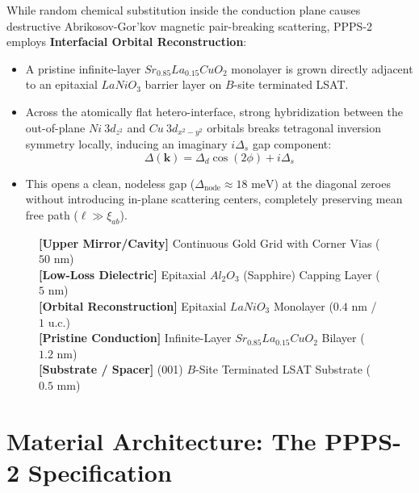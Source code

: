\documentclass[10pt,twocolumn,letterpaper]{article}
\begin{document}
While random chemical substitution inside the conduction plane causes destructive Abrikosov-Gor'kov magnetic pair-breaking scattering, PPPS-2 employs \textbf{Interfacial Orbital Reconstruction}:
\begin{itemize}
    \item A pristine infinite-layer $Sr_{0.85}La_{0.15}CuO_2$ monolayer is grown directly adjacent to an epitaxial $LaNiO_3$ barrier layer on $B$-site terminated LSAT.
    \item Across the atomically flat hetero-interface, strong hybridization between the out-of-plane $Ni\ 3d_{z^2}$ and $Cu\ 3d_{x^2-y^2}$ orbitals breaks tetragonal inversion symmetry locally, inducing an imaginary $i\Delta_s$ gap component:
    \begin{equation}
    \Delta(\mathbf{k}) = \Delta_d \cos(2\phi) + i \Delta_s
    \end{equation}
    \item This opens a clean, nodeless gap ($\Delta_{\text{node}} \approx 18\text{ meV}$) at the diagonal zeroes without introducing in-plane scattering centers, completely preserving mean free path ($\ell \gg \xi_{ab}$).
\end{itemize}

\begin{figure}[ht]
\centering
\begin{tcolorbox}[colback=white,colframe=mgpblue,title=\textbf{Figure 1: PPPS-2 Heterostructure Cross-Section},fonttitle=\small\bfseries]
\footnotesize
\textbf{[Upper Mirror/Cavity]} Continuous Gold Grid with Corner Vias ($50\text{ nm}$)\\[0.05cm]
\textbf{[Low-Loss Dielectric]} Epitaxial $Al_2O_3$ (Sapphire) Capping Layer ($5\text{ nm}$)\\[0.05cm]
\textbf{[Orbital Reconstruction]} Epitaxial $LaNiO_3$ Monolayer ($0.4\text{ nm}$ / $1\text{ u.c.}$)\\[0.05cm]
\textbf{[Pristine Conduction]} Infinite-Layer $Sr_{0.85}La_{0.15}CuO_2$ Bilayer ($1.2\text{ nm}$)\\[0.05cm]
\textbf{[Substrate / Spacer]} (001) $B$-Site Terminated LSAT Substrate ($0.5\text{ mm}$)
\end{tcolorbox}
\end{figure}

\section{Material Architecture: The PPPS-2 Specification}
\end{document}
